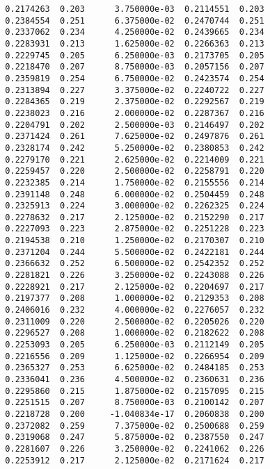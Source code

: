 \documentclass[
  letterpaper,
  DIV=11,
  numbers=noendperiod]{scrartcl}
\begin{document}
\begin{verbatim}
  0.2174263  0.203      3.750000e-03  0.2114551  0.203           
  0.2384554  0.251      6.375000e-02  0.2470744  0.251           
  0.2337062  0.234      4.250000e-02  0.2439665  0.234           
  0.2283931  0.213      1.625000e-02  0.2266363  0.213           
  0.2229745  0.205      6.250000e-03  0.2173705  0.205           
  0.2218470  0.207      8.750000e-03  0.2057156  0.207           
  0.2359819  0.254      6.750000e-02  0.2423574  0.254           
  0.2313894  0.227      3.375000e-02  0.2240722  0.227           
  0.2284365  0.219      2.375000e-02  0.2292567  0.219           
  0.2238023  0.216      2.000000e-02  0.2287367  0.216           
  0.2204791  0.202      2.500000e-03  0.2146497  0.202           
  0.2371424  0.261      7.625000e-02  0.2497876  0.261           
  0.2328174  0.242      5.250000e-02  0.2380853  0.242           
  0.2279170  0.221      2.625000e-02  0.2214009  0.221           
  0.2259457  0.220      2.500000e-02  0.2258791  0.220           
  0.2232385  0.214      1.750000e-02  0.2155556  0.214           
  0.2391148  0.248      6.000000e-02  0.2504459  0.248           
  0.2325913  0.224      3.000000e-02  0.2262325  0.224           
  0.2278632  0.217      2.125000e-02  0.2152290  0.217           
  0.2227093  0.223      2.875000e-02  0.2251228  0.223           
  0.2194538  0.210      1.250000e-02  0.2170307  0.210           
  0.2371204  0.244      5.500000e-02  0.2422181  0.244           
  0.2366632  0.252      6.500000e-02  0.2542352  0.252           
  0.2281821  0.226      3.250000e-02  0.2243088  0.226           
  0.2228921  0.217      2.125000e-02  0.2204697  0.217           
  0.2197377  0.208      1.000000e-02  0.2129353  0.208           
  0.2406016  0.232      4.000000e-02  0.2276057  0.232           
  0.2311009  0.220      2.500000e-02  0.2205026  0.220           
  0.2296527  0.208      1.000000e-02  0.2182622  0.208           
  0.2253093  0.205      6.250000e-03  0.2112149  0.205           
  0.2216556  0.209      1.125000e-02  0.2266954  0.209           
  0.2365327  0.253      6.625000e-02  0.2484185  0.253           
  0.2336041  0.236      4.500000e-02  0.2360631  0.236           
  0.2295860  0.215      1.875000e-02  0.2157095  0.215           
  0.2251515  0.207      8.750000e-03  0.2100142  0.207           
  0.2218728  0.200     -1.040834e-17  0.2060838  0.200           
  0.2372082  0.259      7.375000e-02  0.2500688  0.259           
  0.2319068  0.247      5.875000e-02  0.2387550  0.247           
  0.2281607  0.226      3.250000e-02  0.2241062  0.226           
  0.2253912  0.217      2.125000e-02  0.2171624  0.217           

\end{verbatim}
\end{document}
